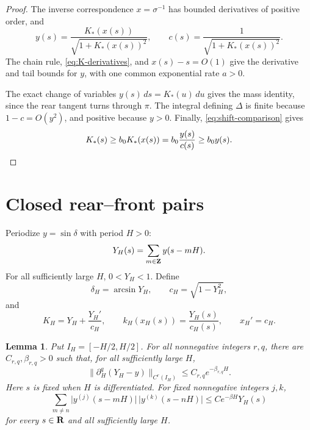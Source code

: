 \documentclass[11pt]{article}
\numberwithin{equation}{section}
\newtheorem{lemma}[theorem]{Lemma}
\newcommand{\R}{{\bf R}}
\newcommand{\Z}{{\bf Z}}
\newcommand{\abs}[1]{\lvert #1\rvert}
\newcommand{\norm}[1]{\lVert #1\rVert}
\begin{document}
\begin{proof}
The inverse correspondence \(x=\sigma^{-1}\) has bounded derivatives of
positive order, and
\begin{equation}\label{eq:y-from-K}
  y(s)=\frac{K_*(x(s))}{\sqrt{1+K_*(x(s))^2}},\qquad
  c(s)=\frac1{\sqrt{1+K_*(x(s))^2}}.
\end{equation}
The chain rule, \eqref{eq:K-derivatives}, and \(x(s)-s=O(1)\) give the
derivative and tail bounds for \(y\), with one common exponential rate
\(a>0\).

The exact change of variables \(y(s)\,ds=K_*(u)\,du\) gives the mass
identity, since the rear tangent turns through \(\pi\). The integral
defining \(\Delta\) is finite because \(1-c=O(y^2)\), and positive because
\(y>0\). Finally, \eqref{eq:shift-comparison} gives
\[
  K_*(s)\geq b_0K_*(x(s))=b_0\frac{y(s)}{c(s)}\geq b_0y(s).
  \qedhere
\]
\end{proof}

\section{Closed rear--front pairs}\label{sec:pairs}

Periodize \(y=\sin\delta\) with period \(H>0\):
\begin{equation}\label{eq:YH}
  Y_H(s)=\sum_{m\in\Z}y(s-mH).
\end{equation}
For all sufficiently large \(H\), \(0<Y_H<1\). Define
\begin{equation}\label{eq:deltaH}
  \delta_H=\arcsin Y_H,\qquad c_H=\sqrt{1-Y_H^2},
\end{equation}
and
\begin{equation}\label{eq:pair-curvatures}
  K_H=Y_H+\frac{Y_H'}{c_H},\qquad
  k_H(x_H(s))=\frac{Y_H(s)}{c_H(s)},\qquad x_H'=c_H.
\end{equation}

\begin{lemma}\label{lem:periodization}
Put \(I_H=[-H/2,H/2]\). For all nonnegative integers \(r,q\), there are
\(C_{r,q},\beta_{r,q}>0\) such that, for all sufficiently large \(H\),
\begin{equation}\label{eq:periodization}
  \norm{\partial_H^q(Y_H-y)}_{C^r(I_H)}
  \leq C_{r,q}e^{-\beta_{r,q}H}.
\end{equation}
Here \(s\) is fixed when \(H\) is differentiated. For fixed nonnegative
integers \(j,k\),
\begin{equation}\label{eq:overlap}
  \sum_{m\ne n}\abs{y^{(j)}(s-mH)}\,\abs{y^{(k)}(s-nH)}
  \leq Ce^{-\beta H}Y_H(s)
\end{equation}
for every \(s\in\R\) and all sufficiently large \(H\).
\end{lemma}
\end{document}
